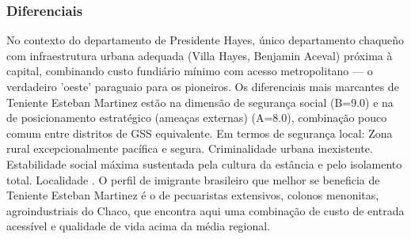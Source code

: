 \subsubsection*{Diferenciais}\label{dif-teniente-esteban-martinez-1508}
No contexto do departamento de Presidente Hayes, único departamento chaqueño com infraestrutura urbana adequada (Villa Hayes, Benjamin Aceval) próxima à capital, combinando custo fundiário mínimo com acesso metropolitano — o verdadeiro 'oeste' paraguaio para os pioneiros. Os diferenciais mais marcantes de Teniente Esteban Martinez estão na dimensão de segurança social (B=9.0) e na de posicionamento estratégico (ameaças externas) (A=8.0), combinação pouco comum entre distritos de GSS equivalente. Em termos de segurança local: Zona rural excepcionalmente pacífica e segura. Criminalidade urbana inexistente. Estabilidade social máxima sustentada pela cultura da estância e pelo isolamento total. Localidade . O perfil de imigrante brasileiro que melhor se beneficia de Teniente Esteban Martinez é o de pecuaristas extensivos, colonos menonitas, agroindustriais do Chaco, que encontra aqui uma combinação de custo de entrada acessível e qualidade de vida acima da média regional.

